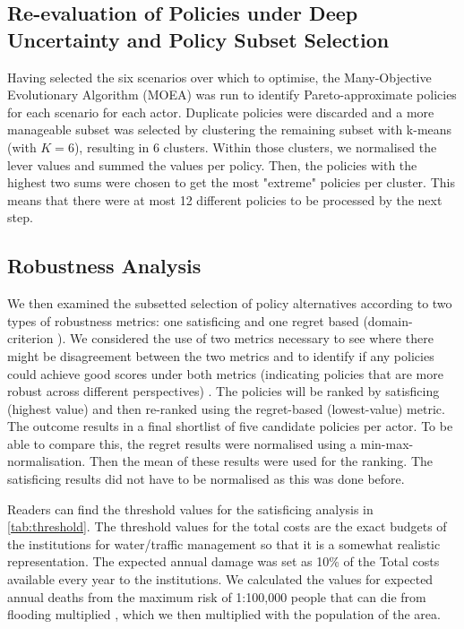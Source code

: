 \subsection{Re-evaluation of Policies under Deep Uncertainty and Policy Subset Selection}
Having selected the six scenarios over which to optimise, the Many-Objective Evolutionary Algorithm (MOEA) was run to identify Pareto-approximate policies for each scenario for each actor. Duplicate policies were discarded and a more manageable subset was selected by clustering the remaining subset with k-means (with $K=6$), resulting in 6 clusters. Within those clusters, we normalised the lever values and summed the values per policy. Then, the policies with the highest two sums were chosen to get the most "extreme" policies per cluster. This means that there were at most 12 different policies to be processed by the next step.

\subsection{Robustness Analysis}
We then examined the subsetted selection of policy alternatives according to two types of robustness metrics: one satisficing and one regret based (domain-criterion \parencite{bartholomew_considering_2020}). We considered the use of two metrics necessary to see where there might be disagreement between the two metrics and to identify if any policies could achieve good scores under both metrics (indicating policies that are more robust across different perspectives) \parencite{mcphail_robustness_2018}. The policies will be ranked by satisficing (highest value) and then re-ranked using the regret-based (lowest-value) metric. The outcome results in a final shortlist of five candidate policies per actor. To be able to compare this, the regret results were normalised using a min-max-normalisation. Then the mean of these results were used for the ranking. The satisficing results did not have to be normalised as this was done before. 

Readers can find the threshold values for the satisficing analysis in \autoref{tab:threshold}. The threshold values for the total costs are the exact budgets of the institutions for water/traffic management so that it is a somewhat realistic representation. The expected annual damage was set as 10\% of the Total costs available every year to the institutions. We calculated the values for expected annual deaths from the maximum risk of 1:100,000 people that can die from flooding multiplied \parencite{slootjes_achtergronden_2016}, which we then multiplied with the population of the area.

